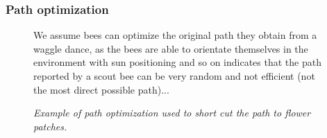 	\subsubsection{Path optimization}
		\begin{figure}
			\centering
			\caption{\textit{Example of path optimization used to short cut the path to flower patches.}}
			\label{fig:pathOptimization}
			We assume bees can optimize the original path they obtain from a waggle dance, as the bees are able to orientate themselves in the environment with sun positioning and so on
			indicates that the path reported by a scout bee can be very random and not efficient (not the most direct possible path)...
		\end{figure}